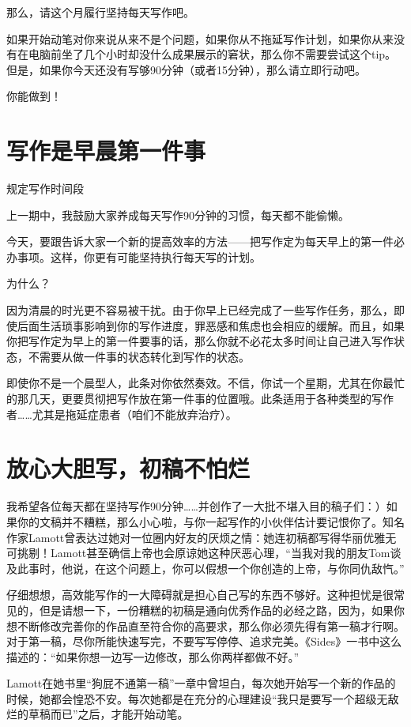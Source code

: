 \documentclass[12pt]{ctexart}
\begin{document}
那么，请这个月履行坚持每天写作吧。

如果开始动笔对你来说从来不是个问题，如果你从不拖延写作计划，如果你从来没有在电脑前坐了几个小时却没什么成果展示的窘状，那么你不需要尝试这个tip。但是，如果你今天还没有写够90分钟（或者15分钟），那么请立即行动吧。

你能做到！

\section{写作是早晨第一件事}

规定写作时间段

上一期中，我鼓励大家养成每天写作90分钟的习惯，每天都不能偷懒。

今天，要跟告诉大家一个新的提高效率的方法——把写作定为每天早上的第一件必办事项。这样，你更有可能坚持执行每天写的计划。

为什么？

因为清晨的时光更不容易被干扰。由于你早上已经完成了一些写作任务，那么，即使后面生活琐事影响到你的写作进度，罪恶感和焦虑也会相应的缓解。而且，如果你把写作定为早上的第一件要事的话，那么你就不必花太多时间让自己进入写作状态，不需要从做一件事的状态转化到写作的状态。

即使你不是一个晨型人，此条对你依然奏效。不信，你试一个星期，尤其在你最忙的那几天，更要贯彻把写作放在第一件事的位置哦。此条适用于各种类型的写作者……尤其是拖延症患者（咱们不能放弃治疗）。

\section{放心大胆写，初稿不怕烂}

我希望各位每天都在坚持写作90分钟……并创作了一大批不堪入目的稿子们：）如果你的文稿并不糟糕，那么小心啦，与你一起写作的小伙伴估计要记恨你了。知名作家Lamott曾表达过她对一位圈内好友的厌烦之情：她连初稿都写得华丽优雅无可挑剔！Lamott甚至确信上帝也会原谅她这种厌恶心理，“当我对我的朋友Tom谈及此事时，他说，在这个问题上，你可以假想一个你创造的上帝，与你同仇敌忾。”

仔细想想，高效能写作的一大障碍就是担心自己写的东西不够好。这种担忧是很常见的，但是请想一下，一份糟糕的初稿是通向优秀作品的必经之路，因为，如果你想不断修改完善你的作品直至符合你的高要求，那么你必须先得有第一稿才行啊。对于第一稿，尽你所能快速写完，不要写写停停、追求完美。《Sides》一书中这么描述的：“如果你想一边写一边修改，那么你两样都做不好。”

Lamott在她书里“狗屁不通第一稿”一章中曾坦白，每次她开始写一个新的作品的时候，她都会惶恐不安。每次她都是在充分的心理建设“我只是要写一个超级无敌烂的草稿而已”之后，才能开始动笔。
\end{document}
